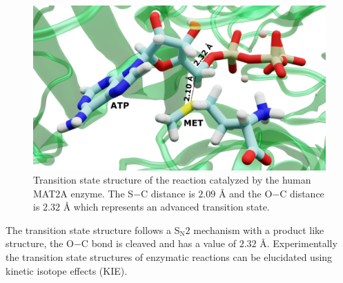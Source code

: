 \documentclass[journal=jpcbfk,manuscript=article,layout=traditional]{achemso}
\begin{document}

\begin{figure}[ht!]
\includegraphics[scale=0.12]{blender-images/ada/mat2a-trans-labelled.png}
\caption{Transition state structure of the reaction catalyzed by the human MAT2A enzyme.
The S$-$C distance is $2.09$ {\AA} and the O$-$C distance is $2.32$ {\AA} which represents 
an advanced transition state.}
\label{fig:mat2a-trans-struct}
\end{figure}
The transition state structure follows a S$_{\text{N}}2$ 
mechanism with a product like structure, the O$-$C bond is cleaved and 
has a value of $2.32$ {\AA}.
Experimentally the transition state structures of enzymatic reactions
can be elucidated using kinetic isotope effects (KIE). \cite{Schramm99MetEnzym308p301}
\end{document}

